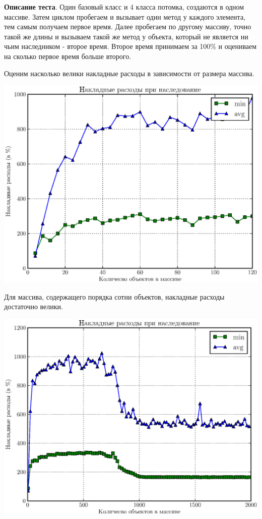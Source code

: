 \documentclass[12pt, a4paper]{article}
\begin{document}
\textbf{Описание теста}. Один базовый класс и 4 класса потомка, создаются в одном массиве. 
Затем циклом пробегаем и вызывает один метод у каждого элемента, тем самым получаем первое время.
Далее пробегаем по другому массиву, точно такой же длины и вызываем такой же метод у объекта, который не является ни чьим наследником - второе время.
Второе время принимаем за 100\% и оцениваем на сколько первое время больше второго. 

Оценим насколько велики накладные расходы в зависимости от размера массива.

{\hspace*{-2.25cm}\includegraphics[scale=1]{apps/compare_virtual_methods_l.eps} }

Для массива, содержащего порядка сотни объектов, накладные расходы достаточно велики.

{\hspace*{-2.25cm}\includegraphics[scale=1]{apps/compare_virtual_methods_b.eps} }
\end{document}
